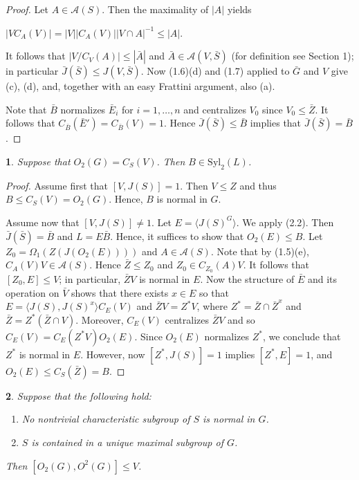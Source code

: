 \documentclass[11pt]{article}
\theoremstyle{plain}
\theoremstyle{stmplain}
\newtheorem{stm}{}[section]
\newcommand{\disp}[1]{\begin{center}$\displaystyle #1$\end{center}}
\begin{document}
\begin{proof}
Let $A \in \mathcal{A}(S)$. Then the maximality of $|A|$ yields
\disp{|VC_A(V)| = |V||C_A(V)||V \cap A|^{-1} \le |A|.}
It follows that $|V/C_V(A)| \le |\bar{A}|$ and $\bar{A} \in \mathcal{A}(V,
\bar{S})$ (for definition see Section 1); in particular $\bar{J}(\bar{S}) \le
J(V, \bar{S})$. Now (1.6)(d) and (1.7) applied to $\bar{G}$ and $V$ give (c),
(d), and, together with an easy Frattini argument, also (a).

\smallskip
\noindent Note that $\bar{B}$ normalizes $\bar{E}_i$ for $i = 1, \ldots, n$ and
centralizes $V_0$ since $V_0 \le \bar{Z}$. It follows that
$C_{\bar{B}}(\bar{E}') = C_{\bar{B}}(V) = 1$. Hence $\bar{J}(\bar{S}) \le
\bar{B}$ implies that $\bar{J}(\bar{S}) = \bar{B}$.
\end{proof}

\begin{stm}\label{st:2.3}
Suppose that $O_2(G) = C_S(V)$. Then $B \in \mathrm{Syl}_2(L)$.
\end{stm}

\begin{proof}
Assume first that $[V, J(S)] = 1$. Then $V \le Z$ and thus $B \le C_S(V) =
O_2(G)$. Hence, $B$ is normal in $G$.

\smallskip
\noindent Assume now that $[V, J(S)] \ne 1$. Let $E = \langle J(S)^G \rangle$. We
apply (2.2). Then $\bar{J}(\bar{S}) = \bar{B}$ and $L = E\bar{B}$. Hence, it
suffices to show that $O_2(E) \le B$. Let $Z_0 = \Omega_1(Z(J(O_2(E))))$ and $A
\in \mathcal{A}(S)$. Note that by (1.5)(e), $C_A(V)V \in \mathcal{A}(S)$.
Hence $\bar{Z} \le Z_0$ and $Z_0 \in C_{Z_0}(A)V$. It follows that $[Z_0, E]
\le V$; in particular, $\bar{Z}V$ is normal in $E$. Now the structure of
$\bar{E}$ and its operation on $\bar{V}$ shows that there exists $x \in E$ so
that $E = \langle J(S), J(S)^x \rangle C_E(V)$ and $\bar{Z}V = Z^*V$, where
$Z^* = \bar{Z} \cap \bar{Z}^x$ and $\bar{Z} = Z^*(\bar{Z} \cap V)$. Moreover,
$C_E(V)$ centralizes $\bar{Z}V$ and so $C_E(V) = C_E(Z^*V)O_2(E)$. Since
$O_2(E)$ normalizes $Z^*$, we conclude that $Z^*$ is normal in $E$. However,
now $[Z^*, J(S)] = 1$ implies $[Z^*, E] = 1$, and $O_2(E) \le C_S(\bar{Z}) = B$.
\end{proof}

\begin{stm}\label{st:2.4}
Suppose that the following hold:
\begin{enumerate}
\item[(i)] No nontrivial characteristic subgroup of $S$ is normal in $G$.
\item[(ii)] $S$ is contained in a unique maximal subgroup of $G$.
\end{enumerate}
Then $[O_2(G), O^2(G)] \le V$.
\end{stm}
\end{document}
